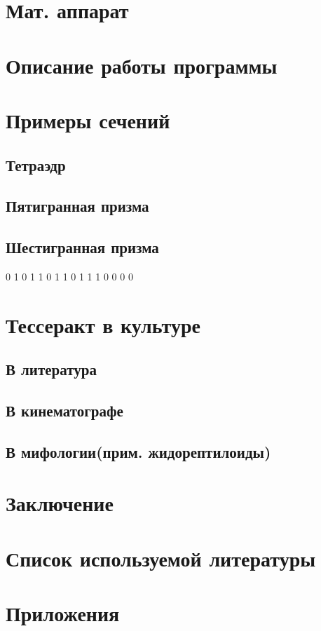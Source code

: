 \documentclass[12pt, a4paper, twoside]{report}
\begin{document}
\section{Мат. аппарат}

\section{Описание работы программы}
\section{Примеры сечений}
\subsection{Тетраэдр}

\subsection{Пятигранная призма}
\subsection{Шестигранная призма}
0 1 0 1
1 0 1 1
0 1 1 1
0 0 0 0
\section{Тессеракт в культуре}
\subsection{В литература}
\subsection{В кинематографе}
\subsection{В мифологии(прим. жидорептилоиды)}
\section{Заключение}
\section{Список используемой литературы}
\section{Приложения}
\end{document}
